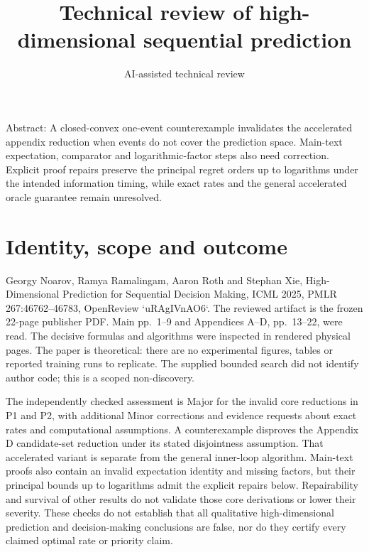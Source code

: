 \documentclass[10pt]{article}
\title{Technical review of high-dimensional sequential prediction}
\author{AI-assisted technical review}
\date{}
\begin{document}
\maketitle
Abstract: A closed-convex one-event counterexample invalidates the accelerated appendix reduction when events do not cover the prediction space. Main-text expectation, comparator and logarithmic-factor steps also need correction. Explicit proof repairs preserve the principal regret orders up to logarithms under the intended information timing, while exact rates and the general accelerated oracle guarantee remain unresolved.\par
\section*{Identity, scope and outcome}
Georgy Noarov, Ramya Ramalingam, Aaron Roth and Stephan Xie, High-Dimensional Prediction for Sequential Decision Making, ICML 2025, PMLR 267:46762–46783, OpenReview `uRAgIVnAO6`. The reviewed artifact is the frozen 22-page publisher PDF. Main pp. 1–9 and Appendices A–D, pp. 13–22, were read. The decisive formulas and algorithms were inspected in rendered physical pages. The paper is theoretical: there are no experimental figures, tables or reported training runs to replicate. The supplied bounded search did not identify author code; this is a scoped non-discovery.\par
The independently checked assessment is Major for the invalid core reductions in P1 and P2, with additional Minor corrections and evidence requests about exact rates and computational assumptions. A counterexample disproves the Appendix D candidate-set reduction under its stated disjointness assumption. That accelerated variant is separate from the general inner-loop algorithm. Main-text proofs also contain an invalid expectation identity and missing factors, but their principal bounds up to logarithms admit the explicit repairs below. Repairability and survival of other results do not validate those core derivations or lower their severity. These checks do not establish that all qualitative high-dimensional prediction and decision-making conclusions are false, nor do they certify every claimed optimal rate or priority claim.\par
\end{document}
